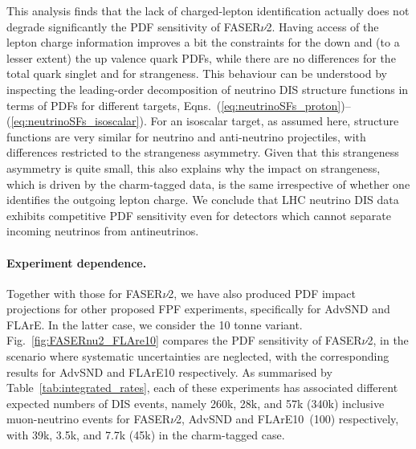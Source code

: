 This analysis finds that the lack of charged-lepton identification actually does not degrade significantly the PDF
sensitivity of FASER$\nu$2.
%
Having access of the lepton charge information improves a bit the constraints for the down and (to a lesser
extent) the up valence quark PDFs,  while there are no differences for the total quark
singlet and for strangeness.
%
This behaviour can be understood by inspecting the leading-order decomposition of neutrino DIS
structure functions in terms of PDFs for different targets, Eqns.~(\ref{eq:neutrinoSFs_proton})--(\ref{eq:neutrinoSFs_isoscalar}).
%
For an isoscalar target, as assumed here, structure functions are very similar for neutrino
and anti-neutrino projectiles, with differences restricted to the strangeness asymmetry.
%
Given that this strangeness asymmetry is quite small, this also explains why the impact
on strangeness, which is driven by the charm-tagged data, is the same irrespective of whether one identifies
the outgoing lepton charge.
%
We conclude that LHC neutrino DIS data exhibits competitive PDF sensitivity even for detectors which cannot
separate incoming neutrinos from antineutrinos.

\paragraph{Experiment dependence.}
%
Together with those for FASER$\nu$2, we have also produced PDF impact projections for
other proposed FPF experiments, specifically for AdvSND and FLArE.
%
In the latter case, we consider the 10 tonne variant.
%
Fig.~\ref{fig:FASERnu2_FLAre10} compares the PDF sensitivity
of FASER$\nu$2, in the scenario where systematic uncertainties are neglected, with the corresponding
results for AdvSND and FLArE10 respectively.
%
As summarised by Table~\ref{tab:integrated_rates}, each of these experiments
has associated different expected numbers of DIS events, namely 260k, 28k, and 57k (340k)
inclusive muon-neutrino events for FASER$\nu$2, AdvSND and FLArE10~(100) respectively,
with 39k, 3.5k, and 7.7k (45k) in the charm-tagged case.

